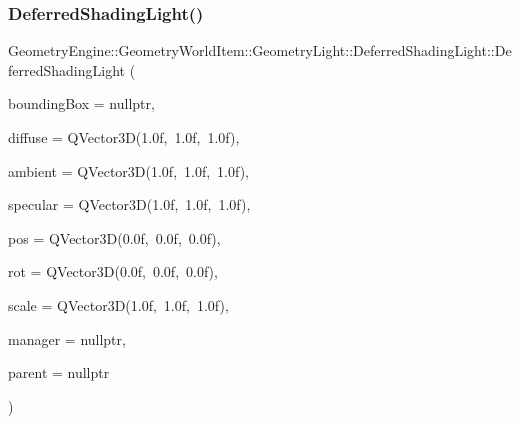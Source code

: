 \subsubsection{\texorpdfstring{DeferredShadingLight()}{DeferredShadingLight()}\hspace{0.1cm}{\footnotesize\ttfamily [1/2]}}
{\footnotesize\ttfamily Geometry\+Engine\+::\+Geometry\+World\+Item\+::\+Geometry\+Light\+::\+Deferred\+Shading\+Light\+::\+Deferred\+Shading\+Light (\begin{DoxyParamCaption}\item[{\mbox{\hyperlink{class_geometry_engine_1_1_geometry_world_item_1_1_geometry_item_1_1_geometry_item}{Geometry\+Item\+::\+Geometry\+Item}} $\ast$}]{bounding\+Box = {\ttfamily nullptr},  }\item[{const Q\+Vector3D \&}]{diffuse = {\ttfamily QVector3D(1.0f,~1.0f,~1.0f)},  }\item[{const Q\+Vector3D \&}]{ambient = {\ttfamily QVector3D(1.0f,~1.0f,~1.0f)},  }\item[{const Q\+Vector3D \&}]{specular = {\ttfamily QVector3D(1.0f,~1.0f,~1.0f)},  }\item[{const Q\+Vector3D \&}]{pos = {\ttfamily QVector3D(0.0f,~0.0f,~0.0f)},  }\item[{const Q\+Vector3D \&}]{rot = {\ttfamily QVector3D(0.0f,~0.0f,~0.0f)},  }\item[{const Q\+Vector3D \&}]{scale = {\ttfamily QVector3D(1.0f,~1.0f,~1.0f)},  }\item[{const \mbox{\hyperlink{class_geometry_engine_1_1_light_utils_1_1_light_component_manager}{Light\+Utils\+::\+Light\+Component\+Manager}} $\ast$const}]{manager = {\ttfamily nullptr},  }\item[{\mbox{\hyperlink{class_geometry_engine_1_1_geometry_world_item_1_1_world_item}{World\+Item}} $\ast$}]{parent = {\ttfamily nullptr} }\end{DoxyParamCaption})}

